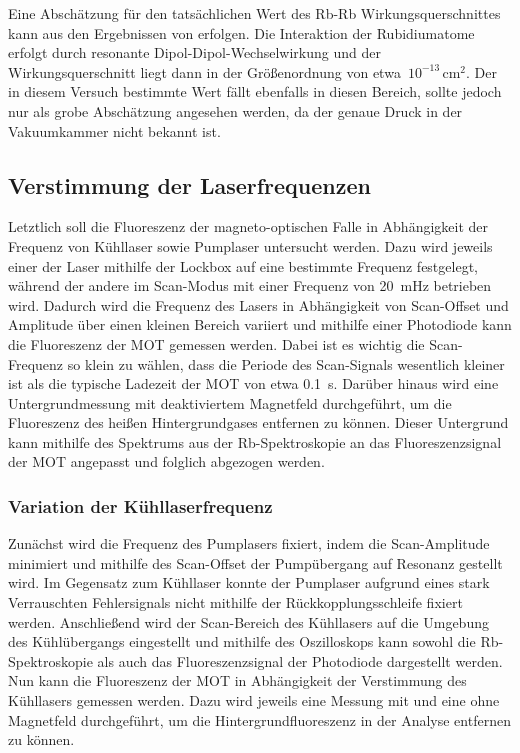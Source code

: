 \documentclass[11pt, a4paper]{article}
\numberwithin{equation}{section}
\begin{document}
Eine Abschätzung für den tatsächlichen Wert des Rb-Rb Wirkungsquerschnittes kann aus den Ergebnissen von \cite{force_in_mot} erfolgen.
Die Interaktion der Rubidiumatome erfolgt durch resonante Dipol-Dipol-Wechselwirkung und der Wirkungsquerschnitt liegt dann in der Größenordnung von etwa~$10^{-13} \, \si{\centi\meter\squared}$.
Der in diesem Versuch bestimmte Wert fällt ebenfalls in diesen Bereich, sollte jedoch nur als grobe Abschätzung angesehen werden, da der genaue Druck in der Vakuumkammer nicht bekannt ist.


\subsection{Verstimmung der Laserfrequenzen}
Letztlich soll die Fluoreszenz der magneto-optischen Falle in Abhängigkeit der Frequenz von Kühllaser sowie Pumplaser untersucht werden.
Dazu wird jeweils einer der Laser mithilfe der Lockbox auf eine bestimmte Frequenz festgelegt, während der andere im Scan-Modus mit einer Frequenz von \SI{20}{mHz} betrieben wird.
Dadurch wird die Frequenz des Lasers in Abhängigkeit von Scan-Offset und Amplitude über einen kleinen Bereich variiert und mithilfe einer Photodiode kann die Fluoreszenz der MOT gemessen werden.
Dabei ist es wichtig die Scan-Frequenz so klein zu wählen, dass die Periode des Scan-Signals wesentlich kleiner ist als die typische Ladezeit der MOT von etwa \SI{0.1}{s}.
Darüber hinaus wird eine Untergrundmessung mit deaktiviertem Magnetfeld durchgeführt, um die Fluoreszenz des heißen Hintergrundgases entfernen zu können.
Dieser Untergrund kann mithilfe des Spektrums aus der Rb-Spektroskopie an das Fluoreszenzsignal der MOT angepasst und folglich abgezogen werden.

\subsubsection{Variation der Kühllaserfrequenz}
\label{sec:detuning_cooling}
Zunächst wird die Frequenz des Pumplasers fixiert, indem die Scan-Amplitude minimiert und mithilfe des Scan-Offset der Pumpübergang auf Resonanz gestellt wird.
Im Gegensatz zum Kühllaser konnte der Pumplaser aufgrund eines stark Verrauschten Fehlersignals nicht mithilfe der Rückkopplungsschleife fixiert werden.
Anschließend wird der Scan-Bereich des Kühllasers auf die Umgebung des Kühlübergangs eingestellt und mithilfe des Oszilloskops kann sowohl die Rb-Spektroskopie als auch das Fluoreszenzsignal der Photodiode dargestellt werden.
Nun kann die Fluoreszenz der MOT in Abhängigkeit der Verstimmung des Kühllasers gemessen werden.
Dazu wird jeweils eine Messung mit und eine ohne Magnetfeld durchgeführt, um die Hintergrundfluoreszenz in der Analyse entfernen zu können.
\end{document}
